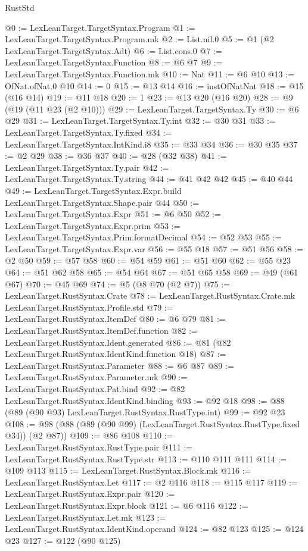 \begin{lexlean}{RustStd}
\begin{coremodule}
@0 := LexLeanTarget.TargetSyntax.Program
@1 := LexLeanTarget.TargetSyntax.Program.mk
@2 := List.nil.{0}
@5 := @1 (@2 LexLeanTarget.TargetSyntax.Adt)
@6 := List.cons.{0}
@7 := LexLeanTarget.TargetSyntax.Function
@8 := @6 @7
@9 := LexLeanTarget.TargetSyntax.Function.mk
@10 := Nat
@11 := @6 @10
@13 := OfNat.ofNat.{0} @10
@14 := 0
@15 := @13 @14
@16 := instOfNatNat
@18 := @15 (@16 @14)
@19 := @11 @18
@20 := 1
@23 := @13 @20 (@16 @20)
@28 := @9 (@19 (@11 @23 (@2 @10)))
@29 := LexLeanTarget.TargetSyntax.Ty
@30 := @6 @29
@31 := LexLeanTarget.TargetSyntax.Ty.int
@32 := @30 @31
@33 := LexLeanTarget.TargetSyntax.Ty.fixed
@34 := LexLeanTarget.TargetSyntax.IntKind.i8
@35 := @33 @34
@36 := @30 @35
@37 := @2 @29
@38 := @36 @37
@40 := @28 (@32 @38)
@41 := LexLeanTarget.TargetSyntax.Ty.pair
@42 := LexLeanTarget.TargetSyntax.Ty.string
@44 := @41 @42 @42
@45 := @40 @44
@49 := LexLeanTarget.TargetSyntax.Expr.build LexLeanTarget.TargetSyntax.Shape.pair @44
@50 := LexLeanTarget.TargetSyntax.Expr
@51 := @6 @50
@52 := LexLeanTarget.TargetSyntax.Expr.prim
@53 := LexLeanTarget.TargetSyntax.Prim.formatDecimal
@54 := @52 @53
@55 := LexLeanTarget.TargetSyntax.Expr.var
@56 := @55 @18
@57 := @51 @56
@58 := @2 @50
@59 := @57 @58
@60 := @54 @59
@61 := @51 @60
@62 := @55 @23
@64 := @51 @62 @58
@65 := @54 @64
@67 := @51 @65 @58
@69 := @49 (@61 @67)
@70 := @45 @69
@74 := @5 (@8 @70 (@2 @7))
@75 := LexLeanTarget.RustSyntax.Crate
@78 := LexLeanTarget.RustSyntax.Crate.mk LexLeanTarget.RustSyntax.Profile.std
@79 := LexLeanTarget.RustSyntax.ItemDef
@80 := @6 @79
@81 := LexLeanTarget.RustSyntax.ItemDef.function
@82 := LexLeanTarget.RustSyntax.Ident.generated
@86 := @81 (@82 LexLeanTarget.RustSyntax.IdentKind.function @18)
@87 := LexLeanTarget.RustSyntax.Parameter
@88 := @6 @87
@89 := LexLeanTarget.RustSyntax.Parameter.mk
@90 := LexLeanTarget.RustSyntax.Pat.bind
@92 := @82 LexLeanTarget.RustSyntax.IdentKind.binding
@93 := @92 @18
@98 := @88 (@89 (@90 @93) LexLeanTarget.RustSyntax.RustType.int)
@99 := @92 @23
@108 := @98 (@88 (@89 (@90 @99) (LexLeanTarget.RustSyntax.RustType.fixed @34)) (@2 @87))
@109 := @86 @108
@110 := LexLeanTarget.RustSyntax.RustType.pair
@111 := LexLeanTarget.RustSyntax.RustType.str
@113 := @110 @111 @111
@114 := @109 @113
@115 := LexLeanTarget.RustSyntax.Block.mk
@116 := LexLeanTarget.RustSyntax.Let
@117 := @2 @116
@118 := @115 @117
@119 := LexLeanTarget.RustSyntax.Expr.pair
@120 := LexLeanTarget.RustSyntax.Expr.block
@121 := @6 @116
@122 := LexLeanTarget.RustSyntax.Let.mk
@123 := LexLeanTarget.RustSyntax.IdentKind.operand
@124 := @82 @123
@125 := @124 @23
@127 := @122 (@90 @125)

\end{coremodule}
\end{lexlean}
